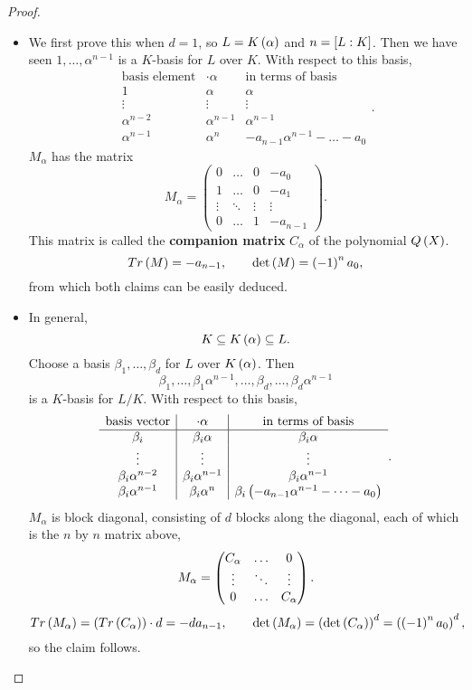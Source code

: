 \begin{proof}
\hfill
\begin{itemize}
\item We first prove this when $ d = 1 $, so $ L = K\rb{\alpha} $ and $ n = \sb{L : K} $. Then we have seen $ 1, \dots, \alpha^{n - 1} $ is a $ K $-basis for $ L $ over $ K $. With respect to this basis,
$$
\begin{array}{c|c|c}
\text{basis element} & \cdot \alpha & \text{in terms of basis} \\
\hline
1 & \alpha & \alpha \\
\vdots & \vdots & \vdots \\
\alpha^{n - 2} & \alpha^{n - 1} & \alpha^{n - 1} \\
\alpha^{n - 1} & \alpha^n & -a_{n - 1}\alpha^{n - 1} - \dots - a_0
\end{array}.
$$
$ M_\alpha $ has the matrix
$$ M_\alpha =
\begin{pmatrix}
0 & \dots & 0 & -a_0 \\
1 & \dots & 0 & -a_1 \\
\vdots & \ddots & \vdots & \vdots \\
0 & \dots & 1 & -a_{n - 1}
\end{pmatrix}.
$$
This matrix is called the \textbf{companion matrix} $ C_\alpha $ of the polynomial $ Q\rb{X} $.
$$ Tr\rb{M} = -a_{n - 1}, \qquad \det\rb{M} = \rb{-1}^na_0, $$
from which both claims can be easily deduced.
\item In general,
$$ K \subseteq K\rb{\alpha} \subseteq L. $$
Choose a basis $ \beta_1, \dots, \beta_d $ for $ L $ over $ K\rb{\alpha} $. Then
$$ \beta_1, \dots, \beta_1\alpha^{n - 1}, \dots, \beta_d, \dots, \beta_d\alpha^{n - 1} $$
is a $ K $-basis for $ L / K $. With respect to this basis,
$$
\begin{array}{c|c|c}
\text{basis vector} & \cdot \alpha & \text{in terms of basis} \\
\hline
\beta_i & \beta_i\alpha & \beta_i\alpha \\
\vdots & \vdots & \vdots \\
\beta_i\alpha^{n - 2} & \beta_i\alpha^{n - 1} & \beta_i\alpha^{n - 1} \\
\beta_i\alpha^{n - 1} & \beta_i\alpha^n & \beta_i\rb{-a_{n - 1}\alpha^{n - 1} - \dots - a_0} \\
\end{array}.
$$
$ M_\alpha $ is block diagonal, consisting of $ d $ blocks along the diagonal, each of which is the $ n $ by $ n $ matrix above,
$$ M_\alpha = \threebythree{C_\alpha}{\dots}{0}{\vdots}{\ddots}{\vdots}{0}{\dots}{C_\alpha}. $$
$$ Tr\rb{M_\alpha} = \rb{Tr\rb{C_\alpha}} \cdot d = -da_{n - 1}, \qquad \det\rb{M_\alpha} = \rb{\det\rb{C_\alpha}}^d = \rb{\rb{-1}^na_0}^d, $$
so the claim follows.
\end{itemize}
\end{proof}

